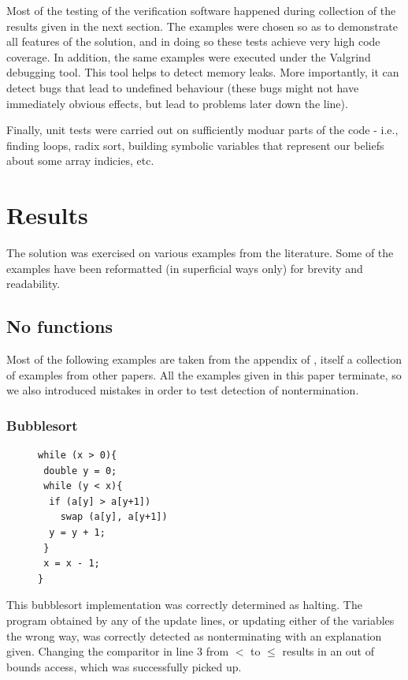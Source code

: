 \documentclass[12pt,a4paper]{article}
\begin{document}
Most of the testing of the verification software happened during collection of the results given in the next section. The examples were chosen so as to demonstrate all features of the solution,
and in doing so these tests achieve very high code coverage. In addition, the same examples were executed under the Valgrind debugging tool. This tool helps to detect memory leaks. More importantly, it can detect bugs that lead to undefined behaviour (these bugs might not have immediately obvious effects, but lead to problems later down the line).

Finally, unit tests were carried out on sufficiently moduar parts of the code - i.e., finding loops, radix sort, building symbolic variables that represent our beliefs about some array indicies,
etc.

\newpage
\section{Results}
The solution was exercised on various examples from the literature. Some of the examples have been reformatted (in superficial ways only)
 for brevity and readability.

\subsection{No functions}
Most of the following examples are taken from the appendix of \citep{tra}, itself a collection of examples from other papers.  All the examples given in this paper terminate, so we also introduced mistakes in order to test detection of nontermination.

\subsubsection{Bubblesort}
\begin{figure}
\centering
\begin{lstlisting}[frame=tlrb,language=myLang]
while (x > 0){
 double y = 0;
 while (y < x){
  if (a[y] > a[y+1])
    swap (a[y], a[y+1])
  y = y + 1;
 }
 x = x - 1;
}
\end{lstlisting}
\end{figure}
This bubblesort implementation was correctly determined as halting. The program obtained by any of the update lines, or updating either of the variables the wrong way, was correctly detected as nonterminating with an explanation given. Changing the comparitor in line $3$ from $<$ to $\leq$ results in an out of bounds access, which was successfully picked up.\\
\end{document}
